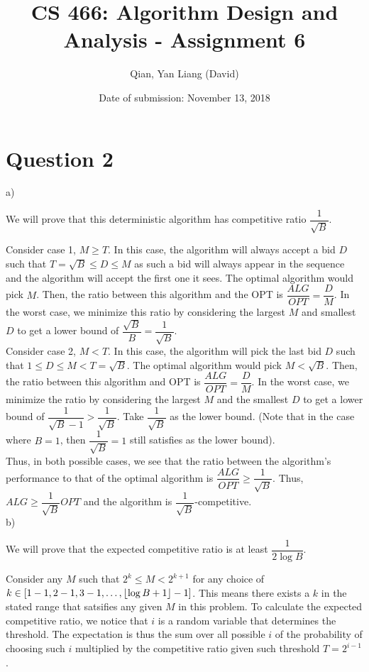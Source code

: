 \documentclass{article}
\title{CS 466: Algorithm Design and Analysis - Assignment 6}
\author{Qian, Yan Liang (David)}
\date{Date of submission: November 13, 2018}
\DeclarePairedDelimiter\floor{\lfloor}{\rfloor}
\begin{document}
\newpage

\section{Question 2}

a)

We will prove that this deterministic algorithm has competitive ratio $\dfrac{1}{\sqrt{B}}$.

Consider case 1, $M \geq T$.  In this case, the algorithm will always accept a bid $D$ such that $T = \sqrt{B} \leq D
\leq M$ as such a bid will always appear in the sequence and the algorithm will accept the first one it sees. The
optimal algorithm would pick $M$. Then, the ratio between this algorithm and the OPT is $\dfrac{ALG}{OPT} =
\dfrac{D}{M}$. In the worst case, we minimize this ratio by considering the largest $M$ and smallest $D$ to get a lower
bound of $\dfrac{\sqrt{B}}{B} = \dfrac{1}{\sqrt{B}}$. \\

Consider case 2, $M < T$. In this case, the algorithm will pick the last bid $D$ such that $1 \leq D \leq M < T = \sqrt{B}$.
The optimal algorithm would pick $M < \sqrt{B}$. Then, the ratio between this algorithm and OPT is $\dfrac{ALG}{OPT} =
\dfrac{D}{M}$. In the worst case, we minimize the ratio by considering the largest $M$ and the smallest $D$ to get a
lower bound of $\dfrac{1}{\sqrt{B} - 1} > \dfrac{1}{\sqrt{B}}$. Take $\dfrac{1}{\sqrt{B}}$ as the lower bound. (Note
that in the case where $B = 1$, then $\dfrac{1}{\sqrt{B}} = 1$ still satisfies as the lower bound). \\

Thus, in both possible cases, we see that the ratio between the algorithm's performance to that of the optimal algorithm
is $\dfrac{ALG}{OPT} \geq \dfrac{1}{\sqrt{B}}$. Thus, $ALG \geq \dfrac{1}{\sqrt{B}} OPT$ and the algorithm is
$\dfrac{1}{\sqrt{B}}$-competitive. \\


b)

We will prove that the expected competitive ratio is at least $\dfrac{1}{2 \log B}$.

Consider any $M$ such that $2^k \leq M < 2^{k+1}$ for any choice of $k \in [1 - 1, 2 - 1, 3 - 1, \ldots, \floor{\log B +
1} - 1]$. This means there exists a $k$ in the stated range that satsifies any given $M$ in this problem. To calculate
the expected competitive ratio, we notice that $i$ is a random variable that determines the threshold.  The expectation
is thus the sum over all possible $i$ of the probability of choosing such $i$ multiplied by the competitive ratio given
such threshold $T = 2^{i - 1}$.
\end{document}
